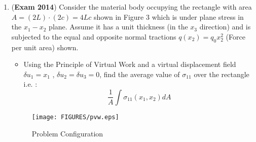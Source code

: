 \documentclass{article}
\newcommand{\ee}{\end{equation}}
\newcommand{\be}{\begin{equation}}
\newcommand{\bi}{\begin{itemize}}
\newcommand{\ei}{\end{itemize}}
\begin{document}
\begin{enumerate}
\item(\textbf{Exam 2014}) 
Consider the  material body occupying the rectangle with area $A=(2L) \cdot (2c) =4 Lc$ shown in Figure  3 %
which is under plane stress in the $x_1-x_2$ plane. Assume it has a unit thickness (in the $x_3$ direction) and is subjected to the equal and opposite normal tractions $q(x_2)=q_0 x_2^2$ (Force per unit area) shown.
\bi
\item Using the Principle of Virtual Work and a virtual displacement field $\delta u_1= x_1$ , $\delta u_2=\delta u_3=0$, find  the average value of $\sigma_{11}$ over the rectangle i.e. :
\be
\frac{1}{A} \int \sigma_{11}(x_1,x_2) dA 
\ee
\ei
\begin{figure}[!h]
\centering
  \texttt{[image: FIGURES/pvw.eps]}
 \caption{Problem Configuration}
 \label{fig:pvw}
\end{figure}


\end{enumerate}
\end{document}
